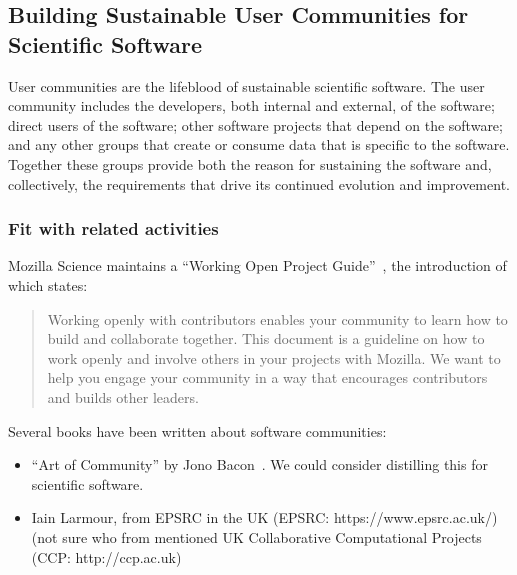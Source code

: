 \subsection{Building Sustainable User Communities for Scientific Software}


User communities are the lifeblood of sustainable scientific software. The user
community includes the developers, both internal and external, of the software;
direct users of the software; other software projects that depend on the
software; and any other groups that create or consume data that is specific to
the software. Together these groups provide both the reason for sustaining the
software and, collectively, the requirements that drive its continued evolution
and improvement.

\subsubsection{Fit with related activities}

Mozilla Science maintains a ``Working Open Project
Guide''~\cite{working-open-wssspe3}, the introduction of which states:
\begin{quote}
Working openly with contributors enables your community to learn how to build
and collaborate together. This document is a guideline on how to work openly and
involve others in your projects with Mozilla. We want to help you engage your
community in a way that encourages contributors and builds other leaders.
 \end{quote}


Several books have been written about software communities: 
\begin{itemize}

\item ``Art of Community'' by Jono Bacon~\cite{art-of-community}. We could
consider distilling this for scientific software.

\item Iain Larmour, from EPSRC in the UK (EPSRC: https://www.epsrc.ac.uk/) (not
sure who from mentioned UK Collaborative Computational Projects (CCP:
http://ccp.ac.uk) 

\end{itemize}

